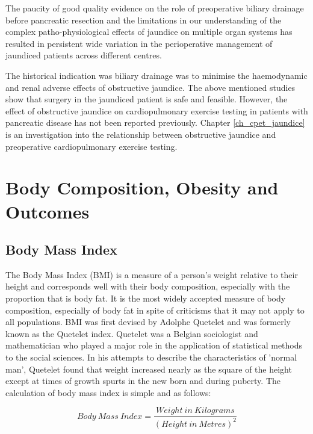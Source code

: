 The paucity of good quality evidence on the role of preoperative biliary drainage before pancreatic resection \parencite{wang_preoperative_2008} and the limitations in our understanding of the complex patho-physiological effects of jaundice on multiple organ systems has resulted in persistent wide variation in the perioperative management of jaundiced patients across different centres.

The historical indication was biliary drainage was to minimise the haemodynamic and renal adverse effects of obstructive jaundice. The above mentioned studies show that surgery in the jaundiced patient is safe and feasible. However, the effect of obstructive jaundice on cardiopulmonary exercise testing in patients with pancreatic disease has not been reported previously. Chapter \ref{ch_cpet_jaundice} is an investigation into the relationship between obstructive jaundice and preoperative cardiopulmonary exercise testing.

\section{Body Composition, Obesity and Outcomes}
\subsection{Body Mass Index}

The Body Mass Index (BMI) is a measure of a person's weight relative to their height and corresponds well with their body composition, especially with the proportion that is body fat. It is the most widely accepted measure of body composition, especially of body fat in spite of criticisms that it may not apply to all populations. BMI was first devised by Adolphe Quetelet and was formerly known as the Quetelet index.\parencite{eknoyan_adolphe_2008} Quetelet was a Belgian sociologist and mathematician who played a major role in the application of statistical methods to the social sciences. In his attempts to describe the characteristics of 'normal man', Quetelet found that weight increased nearly as the square of the height except at times of growth spurts in the new born and during puberty. \parencite{quetelet_treatise_1842} The calculation of body mass index is simple and as follows:

\begin{equation} \label{eq:bmi}
Body\ Mass\ Index = \frac{Weight\ in\ Kilograms}{(Height\ in\ Metres)^2}
\end{equation}

